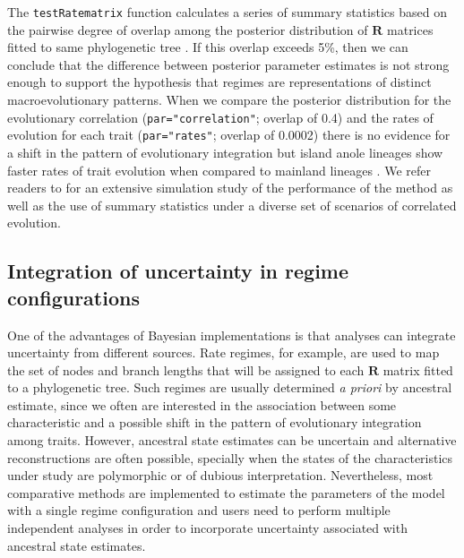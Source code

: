 The \texttt{testRatematrix} function calculates a series of summary statistics based on the pairwise degree of overlap among the posterior distribution of $\mathbf{R}$ matrices fitted to same phylogenetic tree \citep{caetano_sysbio_2017}. If this overlap exceeds 5\%, then we can conclude that the difference between posterior parameter estimates is not strong enough to support the hypothesis that regimes are representations of distinct macroevolutionary patterns. When we compare the posterior distribution for the evolutionary correlation (\texttt{par="correlation"}; overlap of 0.4) and the rates of evolution for each trait (\texttt{par="rates"}; overlap of 0.0002) there is no evidence for a shift in the pattern of evolutionary integration but island anole lineages show faster rates of trait evolution when compared to mainland lineages \citep[Figure \ref{fig:anolesGrid}, see also][]{caetano_sysbio_2017}. We refer readers to \citet{caetano_sysbio_2017} for an extensive simulation study of the performance of the method as well as the use of summary statistics under a diverse set of scenarios of correlated evolution.

\subsection{ Integration of uncertainty in regime configurations }

One of the advantages of Bayesian implementations is that analyses can integrate uncertainty from different sources. Rate regimes, for example, are used to map the set of nodes and branch lengths that will be assigned to each $\mathbf{R}$ matrix fitted to a phylogenetic tree. Such regimes are usually determined \textit{a priori} by ancestral estimate, since we often are interested in the association between some characteristic and a possible shift in the pattern of evolutionary integration among traits. However, ancestral state estimates can be uncertain and alternative reconstructions are often possible, specially when the states of the characteristics under study are polymorphic or of dubious interpretation. Nevertheless, most comparative methods are implemented to estimate the parameters of the model with a single regime configuration and users need to perform multiple independent analyses in order to incorporate uncertainty associated with ancestral state estimates.

